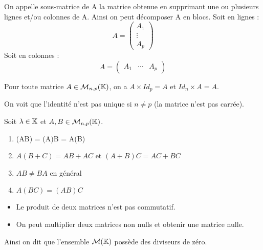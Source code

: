 \documentclass[a4paper, 12pt]{article}
\begin{document}
\begin{definition}
    On appelle sous-matrice de A la matrice obtenue en supprimant une ou plusieurs lignes et/ou colonnes de A.
    Ainsi on peut décomposer A en blocs.
    Soit en lignes :
    $$
        A = \begin{pmatrix}
            A_1 \\
            \vdots \\
            A_p
        \end{pmatrix}
    $$
    Soit en colonnes :
    $$
        A = \begin{pmatrix}
            A_1 & \cdots & A_p
        \end{pmatrix}
    $$
\end{definition}

\begin{proprietes}
    Pour toute matrice $A \in \mathcal{M}_{n, p}(\mathbb{K})$, on a
    $A \times Id_p = A$ et $Id_n \times A = A$.
\end{proprietes}

\begin{remark}
    On voit que l'identité n'est pas unique si $n \neq p$ (la matrice n'est pas carrée).
\end{remark}

\begin{proprietes}
    Soit $\lambda \in \mathbb{K}$ et $A, B \in \mathcal{M}_{n, p}(\mathbb{K})$.
    \begin{enumerate}
        \item \lambda(AB) = (\lambda A)B = A(\lambda B)
        \item $A(B + C) = AB + AC$ et $(A + B)C = AC + BC$
        \item $AB \neq BA$ en général
        \item $A(BC) = (AB)C$
    \end{enumerate}
\end{proprietes}

\begin{remark}
    \begin{itemize}.
        \item Le produit de deux matrices n'est pas commutatif.
        \item On peut multiplier deux matrices non nulls et obtenir une matrice nulle.
    \end{itemize}
    Ainsi on dit que l'ensemble $\mathcal{M}(\mathbb{K})$ possède des diviseurs de zéro.
\end{remark}
\end{document}
